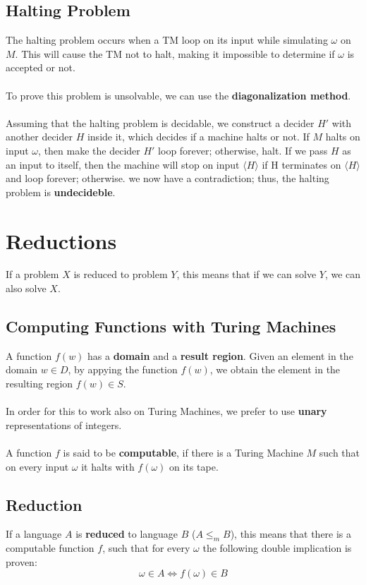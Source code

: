 \documentclass{article}
\begin{document}
\subsection{Halting Problem}
The halting problem occurs when a TM loop on its input while simulating $\omega$ on $M$. This will cause the TM not to halt, making it impossible to determine if $\omega$ is accepted or not. \\ \\
To prove this problem is unsolvable, we can use the \textbf{diagonalization method}. \\ \\
Assuming that the halting problem is decidable, we construct a decider $H'$ with another decider $H$ inside it, which decides if a machine halts or not. If $M$ halts on input $\omega$, then make the decider $H'$ loop forever; otherwise, halt. If we pass $H$ as an input to itself, then the machine will stop on input $\langle H \rangle$ if H terminates on $\langle H \rangle$ and loop forever; otherwise. we now have a contradiction; thus, the halting problem is \textbf{undecideble}.

\section{Reductions}
If a problem $X$ is reduced to problem $Y$, this means that if we can solve $Y$, we can also solve $X$.

\subsection{Computing Functions with Turing Machines}
A function $f(w)$ has a \textbf{domain} and a \textbf{result region}. Given an element in the domain $w \in D$, by appying the function $f(w)$, we obtain the element in the resulting region $f(w) \in S$. \\ \\
In order for this to work also on Turing Machines, we prefer to use \textbf{unary} representations of integers. \\ \\
A function $f$ is said to be \textbf{computable}, if there is a Turing Machine $M$ such that on every input $\omega$ it halts with $f(\omega)$ on its tape.

\subsection{Reduction}
If a language $A$ is \textbf{reduced} to language $B$ ($A \leq_m B$), this means that there is a computable function $f$, such that for every $\omega$ the following double implication is proven:
\[ \omega \in A \iff f(\omega) \in B \]
\end{document}
